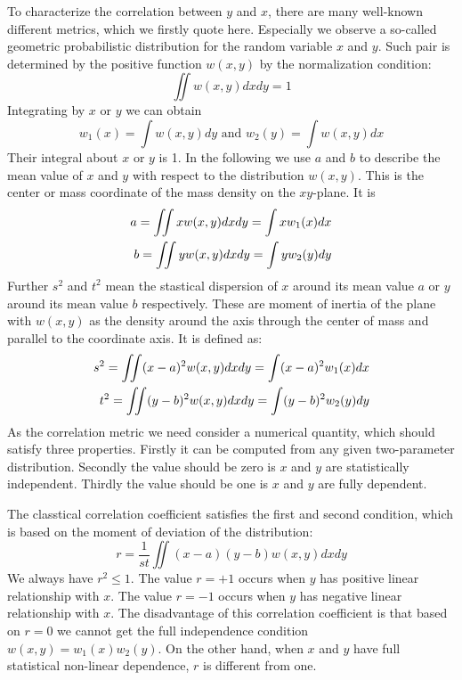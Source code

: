 \documentclass{article}
\begin{document}
To characterize the correlation between $y$ and $x$,
there are many well-known different metrics, which we firstly quote here. Especially we observe a so-called
geometric probabilistic distribution for the random variable $x$ and $y$. Such pair is determined by the
positive function $w(x,y)$ by the normalization condition:
\begin{equation}
    \iint w(x,y) dx dy = 1
\end{equation}
Integrating by $x$ or $y$ we can obtain
\begin{equation}
    w_1(x) = \int w(x,y)dy \textrm{ and }
    w_2(y) = \int w(x,y)dx
\end{equation}
Their integral about $x$ or $y$ is 1. In the following we use $a$
and $b$ to describe the mean value of $x$ and $y$
with respect to the distribution $w(x,y)$.
This is the center or mass coordinate of the mass
density on the $xy$-plane. It is
\begin{align}
    a = \iint x w(x,y) dx dy = \int x w_1(x)dx \notag \\
    b = \iint y w(x,y) dx dy = \int y w_2(y)dy 
\end{align}
Further $s^2$ and $t^2$ mean the stastical dispersion of $x$ around its mean value $a$
or $y$ around its mean value $b$ respectively.
These are moment of inertia of the plane with $w(x,y)$ as the density around the axis through the
center of mass and parallel to the coordinate axis. It is defined as:
\begin{align}
    s^2 = \iint (x-a)^2 w(x,y) dx dy = \int (x-a)^2 w_1(x)dx \notag \\
    t^2 = \iint (y-b)^2 w(x,y) dx dy = \int (y-b)^2 w_2(y)dy 
\end{align}
As the correlation metric we need consider a numerical quantity, which should satisfy three properties.
Firstly it can be computed from any given two-parameter distribution. Secondly the value should
be zero is $x$ and $y$ are statistically independent. Thirdly the value should be one is $x$ and $y$
are fully dependent.

The classtical correlation coefficient satisfies the first and second condition, which is based on the moment of deviation
of the distribution:
\begin{equation}
r = \frac{1}{st} \iint (x-a)(y-b)w(x,y)dxdy
\end{equation}
We always have $r^2 \leq 1$.
The value $r=+ 1$ occurs when $y$ has positive linear relationship with $x$.
The value $r= - 1$ occurs when $y$ has negative linear relationship with $x$.
The disadvantage of this correlation coefficient is that based on $r=0$ we cannot get the
full independence condition $w(x,y)=w_1(x)w_2(y)$.
On the other hand, when $x$ and $y$ have full statistical non-linear dependence, $r$
is different from one.
\end{document}
